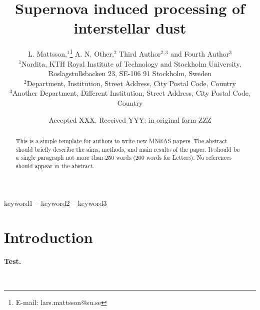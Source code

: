 \documentclass[fleqn,usenatbib]{mnras}
\title[Supernova induced processing of interstellar dust]{Supernova induced processing of interstellar dust}
\author[L. Mattsson et al.]{
L. Mattsson,$^{1}$\thanks{E-mail: lars.mattsson@su.se}
A. N. Other,$^{2}$
Third Author$^{2,3}$
and Fourth Author$^{3}$
\\
$^{1}$Nordita, KTH Royal Institute of Technology and Stockholm University, Roslagstullsbacken 23, SE-106 91 Stockholm, Sweden\\
$^{2}$Department, Institution, Street Address, City Postal Code, Country\\
$^{3}$Another Department, Different Institution, Street Address, City Postal Code, Country
}
\date{Accepted XXX. Received YYY; in original form ZZZ}
\newcommand{\fk}[1]{{\bf \textcolor{PineGreen}{#1}}}		%
\begin{document}
\label{firstpage}
\pagerange{\pageref{firstpage}--\pageref{lastpage}}
\maketitle

\begin{abstract}
This is a simple template for authors to write new MNRAS papers.
The abstract should briefly describe the aims, methods, and main results of the paper.
It should be a single paragraph not more than 250 words (200 words for Letters).
No references should appear in the abstract.
\end{abstract}

\begin{keywords}
keyword1 -- keyword2 -- keyword3
\end{keywords}



\section{Introduction}
\fk{Test.}

\newpage~
\newpage
\end{document}
